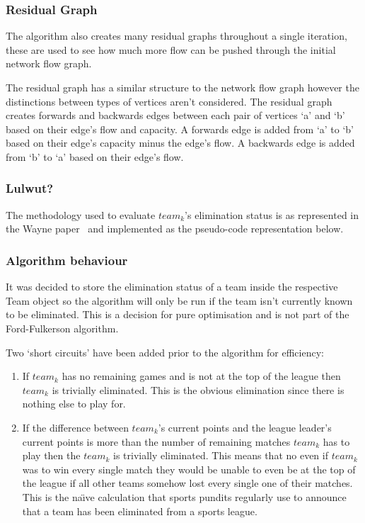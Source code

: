 \subsubsection{Residual Graph}

The algorithm also creates many residual graphs throughout a single iteration,
these are used to see how much more flow can be pushed through the initial
network flow graph.

The residual graph has a similar structure to the network flow graph however
the distinctions between types of vertices aren't considered. The residual
graph creates forwards and backwards edges between each pair of vertices `a'
and `b' based on their edge's flow and capacity. A forwards edge is added from
`a' to `b' based on their edge's capacity minus the edge's flow. A backwards 
edge is added from `b' to `a' based on their edge's flow.

\subsubsection{Lulwut?}

The methodology used to evaluate $team_k$'s elimination status is as
represented in the Wayne paper~\cite{Wayne} and implemented as the
pseudo-code representation below. 

\subsubsection{Algorithm behaviour}

It was decided to store the elimination status of a team inside the
respective Team object so the algorithm will only be run if the team isn't
currently known to be eliminated. This is a decision for pure optimisation and 
is not part of the Ford-Fulkerson algorithm.

Two `short circuits' have been added prior to the algorithm for efficiency:
\begin{enumerate}
\item If $team_k$ has no remaining games and is not at the top of the league
then $team_k$ is trivially eliminated. This is the obvious elimination since
there is nothing else to play for.
\item If the difference between $team_k$'s current points and the league 
leader's current points is more than the number of remaining matches $team_k$ 
has to play then the $team_k$ is trivially eliminated. This means that no even 
if $team_k$ was to win every single match they would be unable to even be at 
the top of the league if all other teams somehow lost every single one of their 
matches. This is the na\"{\i}ve calculation that sports pundits regularly use 
to announce that a team has been eliminated from a sports league.
\end{enumerate}

